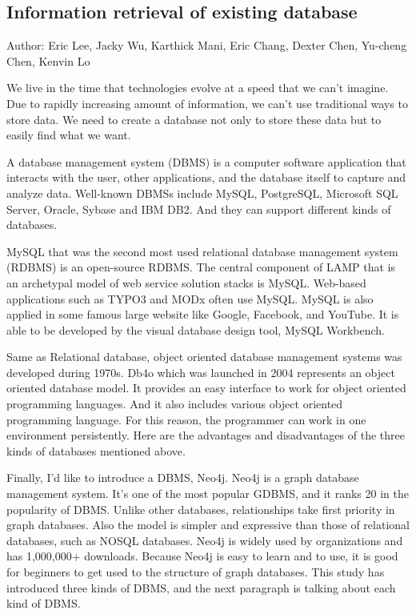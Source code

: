 	
\subsection{Information retrieval of existing database}
Author: Eric Lee, Jacky Wu, Karthick Mani, Eric Chang, Dexter Chen, Yu-cheng Chen, Kenvin Lo

We live in the time that technologies evolve at a speed that we can't imagine. Due to rapidly increasing amount of information, we can't use traditional ways to store data. We need to create a database not only to store these data but to easily find what we want.

A database management system (DBMS) is a computer software application that interacts with the user, other applications, and the database itself to capture and analyze data. Well-known DBMSs include MySQL, PostgreSQL, Microsoft SQL Server, Oracle, Sybase and IBM DB2. And they can support different kinds of databases.

MySQL that was the second most used relational database management system (RDBMS) is an open-source RDBMS. The central component of LAMP that is an archetypal model of web service solution stacks is MySQL. Web-based applications such as TYPO3 and MODx often use MySQL. MySQL is also applied in some famous large website like Google, Facebook, and YouTube. It is able to be developed by the visual database design tool, MySQL Workbench.

Same as Relational database, object oriented database management systems was developed during 1970s. Db4o which was launched in 2004 represents an object oriented database model. It provides an easy interface to work for object oriented programming languages. And it also includes various object oriented programming language. For this reason, the programmer can work in one environment persistently. Here are the advantages and disadvantages of the three kinds of databases mentioned above.

Finally, I’d like to introduce a DBMS, Neo4j. Neo4j is a graph database management system. It’s one of the most popular GDBMS, and it ranks 20 in the popularity of DBMS. Unlike other databases, relationships take first priority in graph databases. Also the model is simpler and expressive than those of relational databases, such as NOSQL databases. Neo4j is widely used by organizations and has 1,000,000+ downloads. Because Neo4j is easy to learn and to use, it is good for beginners to get used to the structure of graph databases. This study has introduced three kinds of DBMS, and the next paragraph is talking about each kind of DBMS.

